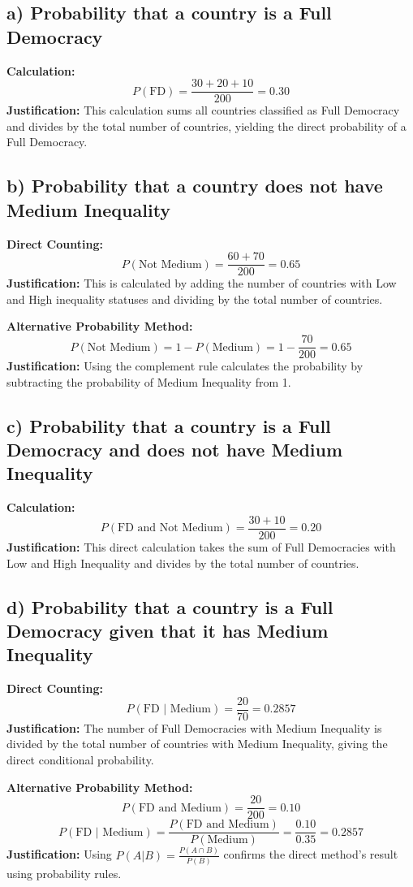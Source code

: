\documentclass{article}
\begin{document}
\subsection*{a) Probability that a country is a Full Democracy}
\textbf{Calculation:}
\[ P(\text{FD}) = \frac{30 + 20 + 10}{200} = 0.30 \]
\textbf{Justification:} This calculation sums all countries classified as Full Democracy and divides by the total number of countries, yielding the direct probability of a Full Democracy.

\subsection*{b) Probability that a country does not have Medium Inequality}
\textbf{Direct Counting:}
\[ P(\text{Not Medium}) = \frac{60 + 70}{200} = 0.65 \]
\textbf{Justification:} This is calculated by adding the number of countries with Low and High inequality statuses and dividing by the total number of countries.

\textbf{Alternative Probability Method:}
\[ P(\text{Not Medium}) = 1 - P(\text{Medium}) = 1 - \frac{70}{200} = 0.65 \]
\textbf{Justification:} Using the complement rule calculates the probability by subtracting the probability of Medium Inequality from 1.

\subsection*{c) Probability that a country is a Full Democracy and does not have Medium Inequality}
\textbf{Calculation:}
\[ P(\text{FD and Not Medium}) = \frac{30 + 10}{200} = 0.20 \]
\textbf{Justification:} This direct calculation takes the sum of Full Democracies with Low and High Inequality and divides by the total number of countries.

\subsection*{d) Probability that a country is a Full Democracy given that it has Medium Inequality}
\textbf{Direct Counting:}
\[ P(\text{FD $|$ Medium}) = \frac{20}{70} = 0.2857 \]
\textbf{Justification:} The number of Full Democracies with Medium Inequality is divided by the total number of countries with Medium Inequality, giving the direct conditional probability.

\textbf{Alternative Probability Method:}
\[ P(\text{FD and Medium}) = \frac{20}{200} = 0.10 \]
\[ P(\text{FD $|$ Medium}) = \frac{P(\text{FD and Medium})}{P(\text{Medium})} = \frac{0.10}{0.35} = 0.2857 \]
\textbf{Justification:} Using \( P(A | B) = \frac{P(A \cap B)}{P(B)} \) confirms the direct method's result using probability rules.
\end{document}
